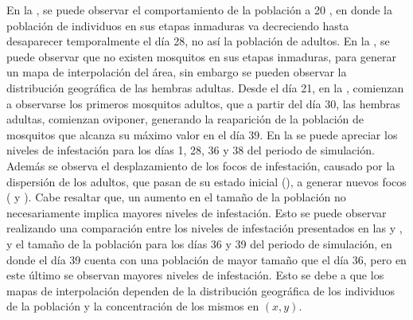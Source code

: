 En la , se puede observar el comportamiento de la población a
20 \textcelsius, en donde la población de individuos en sus etapas inmaduras va decreciendo hasta
desaparecer temporalmente el día 28, no así la población de adultos. En la
, se puede observar que no existen mosquitos en sus etapas
inmaduras, para generar un mapa de interpolación del área, sin embargo se pueden observar la
distribución geográfica de las hembras adultas. Desde el día 21, en la
, comienzan a observarse los primeros mosquitos adultos, que a
partir del día 30, las hembras adultas, comienzan oviponer, generando la reaparición de la
población de mosquitos que alcanza su máximo valor en el día 39. En la
 se puede apreciar los niveles de infestación para los
días 1, 28, 36 y 38 del periodo de simulación. Además se observa el desplazamiento de los focos de
infestación, causado por la dispersión de los adultos, que pasan de su estado inicial
(), a generar nuevos focos
( y ). Cabe resaltar
que, un aumento en el tamaño de la población no necesariamente implica mayores niveles de
infestación. Esto se puede observar realizando una comparación entre los niveles de infestación
presentados en las  y ,
y el tamaño de la población para los días 36 y 39 del periodo de simulación, en donde el día 39
cuenta con una población de mayor tamaño que el día 36, pero en este último se observan mayores
niveles de infestación. Esto se debe a que los mapas de interpolación dependen de la distribución
geográfica de los individuos de la población y la concentración de los mismos en $(x,y)$.



